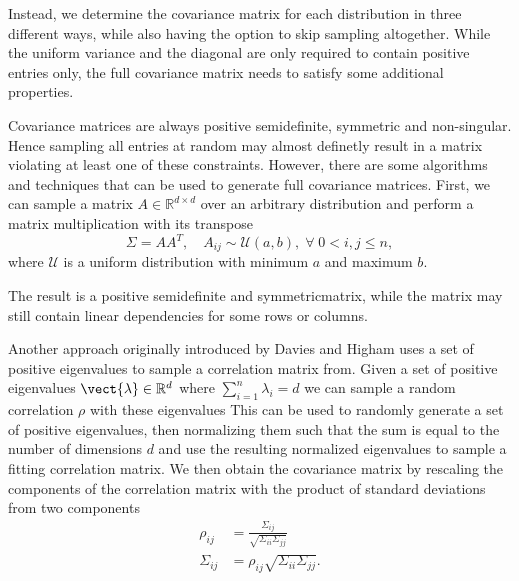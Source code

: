 Instead, we determine the covariance matrix for each distribution in three different ways, while also having the option to skip sampling altogether.
While the uniform variance and the diagonal are only required to contain positive entries only, the full covariance matrix needs to satisfy some additional properties.

Covariance matrices are always positive semidefinite, symmetric and non-singular. 
Hence sampling all entries at random may almost definetly result in a matrix violating at least one of these constraints.
However, there are some algorithms and techniques that can be used to generate full covariance matrices.
First, we can sample a matrix $A\in \mathbb{R}^{d \times d}$ over an arbitrary distribution and perform a matrix multiplication with its transpose
\begin{equation}
    \Sigma = AA^T, \quad A_{ij}\sim\mathcal{U}(a,b), \; \forall \;0 < i,j \leq n,
\end{equation}
where $\mathcal{U}$ is a uniform distribution with minimum $a$ and maximum $b$.

The result is a positive semidefinite and symmetricmatrix, while the matrix may still contain linear dependencies for some rows or columns.

Another approach originally introduced by Davies and Higham \cite{davies2000numerically} uses a set of positive eigenvalues to sample a correlation matrix from.
Given a set of positive eigenvalues $\vect{\lambda}\in \mathbb{R}^d$ where $\sum_{i=1}^n \lambda_i = d$ we can sample a random correlation $\rho$ with these eigenvalues
This can be used to randomly generate a set of positive eigenvalues, then normalizing them such that the sum is equal to the number of dimensions $d$ and use the resulting normalized eigenvalues to sample a fitting correlation matrix. 
We then obtain the covariance matrix by rescaling the components of the correlation matrix with the product of standard deviations from two components 
\begin{equation}
    \begin{split}
            \rho_{ij} &= \frac{\Sigma_{ij}}{\sqrt{\Sigma_{ii}\Sigma_{jj}}} \\
            \Sigma_{ij} &=  \rho_{ij}\sqrt{\Sigma_{ii}\Sigma_{jj}}.
    \end{split}
\end{equation}


